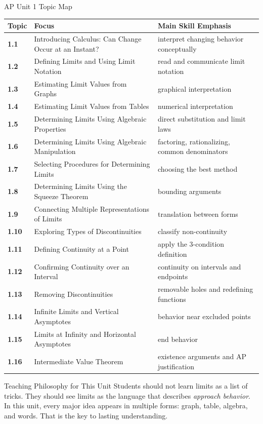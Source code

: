 \documentclass[11pt]{article}
\begin{document}
\begin{theorybox}{AP Unit 1 Topic Map}
\renewcommand{\arraystretch}{1.28}
\begin{tabularx}{\textwidth}{>{\bfseries}p{} X >{\raggedright\arraybackslash}p{}}
\toprule
Topic & Focus & Main Skill Emphasis \\
\midrule
1.1 & Introducing Calculus: Can Change Occur at an Instant? & interpret changing behavior conceptually \\
1.2 & Defining Limits and Using Limit Notation & read and communicate limit notation \\
1.3 & Estimating Limit Values from Graphs & graphical interpretation \\
1.4 & Estimating Limit Values from Tables & numerical interpretation \\
1.5 & Determining Limits Using Algebraic Properties & direct substitution and limit laws \\
1.6 & Determining Limits Using Algebraic Manipulation & factoring, rationalizing, common denominators \\
1.7 & Selecting Procedures for Determining Limits & choosing the best method \\
1.8 & Determining Limits Using the Squeeze Theorem & bounding arguments \\
1.9 & Connecting Multiple Representations of Limits & translation between forms \\
1.10 & Exploring Types of Discontinuities & classify non-continuity \\
1.11 & Defining Continuity at a Point & apply the 3-condition definition \\
1.12 & Confirming Continuity over an Interval & continuity on intervals and endpoints \\
1.13 & Removing Discontinuities & removable holes and redefining functions \\
1.14 & Infinite Limits and Vertical Asymptotes & behavior near excluded points \\
1.15 & Limits at Infinity and Horizontal Asymptotes & end behavior \\
1.16 & Intermediate Value Theorem & existence arguments and AP justification \\
\bottomrule
\end{tabularx}
\end{theorybox}

\begin{notebox}{Teaching Philosophy for This Unit}
Students should not learn limits as a list of tricks. They should see limits as the language that describes \emph{approach behavior}. In this unit, every major idea appears in multiple forms: graph, table, algebra, and words. That is the key to lasting understanding.
\end{notebox}
\end{document}
